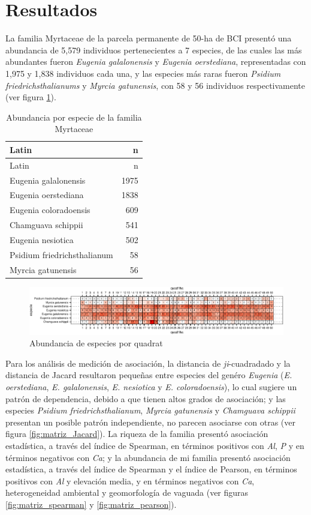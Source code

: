 \documentclass[11pt,]{article}
\begin{document}
\section{Resultados}\label{resultados}

La familia Myrtaceae de la parcela permanente de 50-ha de BCI presentó
una abundancia de 5,579 individuos pertenecientes a 7 especies, de las
cuales las más abundantes fueron \emph{Eugenia galalonensis} y
\emph{Eugenia oerstediana}, representadas con 1,975 y 1,838 individuos
cada una, y las especies más raras fueron \emph{Psidium
friedrichsthalianums} y \emph{Myrcia gatunensis}, con 58 y 56 individuos
respectivamente (ver figura \ref{tab:abun_sp}).

\begin{longtable}[]{@{}lr@{}}
\caption{\label{tab:abun_sp}Abundancia por especie de la familia
Myrtaceae}\tabularnewline
\toprule
Latin & n\tabularnewline
\midrule
\endfirsthead
\toprule
Latin & n\tabularnewline
\midrule
\endhead
Eugenia galalonensis & 1975\tabularnewline
Eugenia oerstediana & 1838\tabularnewline
Eugenia coloradoensis & 609\tabularnewline
Chamguava schippii & 541\tabularnewline
Eugenia nesiotica & 502\tabularnewline
Psidium friedrichsthalianum & 58\tabularnewline
Myrcia gatunensis & 56\tabularnewline
\bottomrule
\end{longtable}

\begin{figure}
\centering
\includegraphics{manuscrito_files/figure-latex/unnamed-chunk-3-1.pdf}
\caption{\label{fig:abun_sp_q}Abundancia de especies por quadrat}
\end{figure}

Para los análisis de medición de asociación, la distancia de
\emph{ji}-cuadradado y la distancia de Jacard resultaron pequeñas entre
especies del genéro \emph{Eugenia} (\emph{E. oerstediana}, \emph{E.
galalonensis}, \emph{E. nesiotica} y \emph{E. coloradoensis}), lo cual
sugiere un patrón de dependencia, debido a que tienen altos grados de
asociación; y las especies \emph{Psidium friedrichsthalianum},
\emph{Myrcia gatunensis} y \emph{Chamguava schippii} presentan un
posible patrón independiente, no parecen asociarse con otras (ver figura
\ref{fig:matriz_Jacard}). La riqueza de la familia presentó asociación
estadística, a través del índice de Spearman, en términos positivos con
\emph{Al}, \emph{P} y en términos negativos con \emph{Ca}; y la
abundancia de mi familia presentó asociación estadística, a través del
índice de Spearman y el índice de Pearson, en términos positivos con
\emph{Al} y elevación media, y en términos negativos con \emph{Ca},
heterogeneidad ambiental y geomorfología de vaguada (ver figuras
\ref{fig:matriz_spearman} y \ref{fig:matriz_pearson}).
\end{document}
